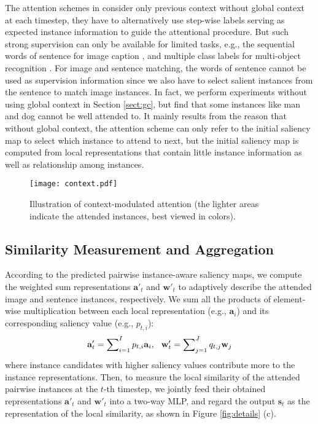 \documentclass[10pt,twocolumn,letterpaper]{article}
\begin{document}
The attention schemes in \cite{xu2015show,bahdanau2014neural,ba2014multiple}
consider only previous context without global context at each timestep,
they have to alternatively use step-wise labels serving as expected instance
information to guide the attentional procedure.
But such strong supervision can only be available for
limited tasks, e.g., the sequential words of sentence for image caption \cite{xu2015show},
and multiple class labels for multi-object recognition \cite{ba2014multiple}.
For image and sentence matching, the words of sentence cannot be used as
supervision information since we also have to select salient instances from
the sentence to match image instances.
In fact, we perform experiments without using global context in Section \ref{sect:gc},
but find that some instances like man and dog cannot be well attended to.
It mainly results from the reason that without global context, the attention scheme
can only refer to the initial saliency map to select which instance to attend to next,
but the initial saliency map is computed from local representations
that contain little instance information as well as relationship among instances.




\begin{figure}[t]
\begin{center}
\texttt{[image: context.pdf]}
\end{center}
\caption{Illustration of context-modulated attention (the lighter areas indicate the attended instances, best
viewed in colors).}
\label{fig:context}
\end{figure}


\subsection{Similarity Measurement and Aggregation}





According to the predicted pairwise instance-aware saliency maps,
we compute the weighted sum representations ${ \textbf{a}'_{t}}$ and ${ \textbf{w}'_{t}}$
to adaptively describe the attended image and sentence instances, respectively.
We sum all the products of element-wise multiplication
between each local representation (e.g., ${{\textbf{a}}_i}$)
and its corresponding saliency value (e.g., ${p_{t,i}}$):
\begin{equation} \label{eqn:e3}
{\textbf{a}'_t} = \sum\nolimits_{i = 1}^I {{p_{t,i}}{\textbf{a}_i}},  {\kern 7pt}
{\textbf{w}'_t} = \sum\nolimits_{j = 1}^J {{q_{t,j}}{\textbf{w}_j}}
\end{equation}
where instance candidates with higher saliency values
contribute more to the instance representations.
Then, to measure the local similarity of the attended pairwise instances at the $t$-th timestep,
we jointly feed their obtained representations
${ \textbf{a}'_{t}}$ and ${ \textbf{w}'_{t}}$ into a two-way MLP, and
regard the output $\textbf{s}_t$ as the representation of the local similarity,
as shown in Figure \ref{fig:details} (c).
\end{document}
